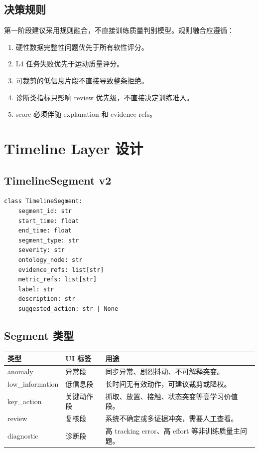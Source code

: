 \documentclass[UTF8,zihao=-4]{ctexart}
\begin{document}
\subsection{决策规则}

第一阶段建议采用规则融合，不直接训练质量判别模型。规则融合应遵循：

\begin{enumerate}
\item 硬性数据完整性问题优先于所有软性评分。
\item L4 任务失败优先于运动质量评分。
\item 可裁剪的低信息片段不直接导致整条拒绝。
\item 诊断类指标只影响 review 优先级，不直接决定训练准入。
\item score 必须伴随 explanation 和 evidence refs。
\end{enumerate}

\section{Timeline Layer 设计}

\subsection{TimelineSegment v2}

\begin{verbatim}
class TimelineSegment:
    segment_id: str
    start_time: float
    end_time: float
    segment_type: str
    severity: str
    ontology_node: str
    evidence_refs: list[str]
    metric_refs: list[str]
    label: str
    description: str
    suggested_action: str | None
\end{verbatim}

\subsection{Segment 类型}

\begin{longtable}{L{3.5cm} L{4cm} L{6cm}}
\toprule
类型 & UI 标签 & 用途 \\
\midrule
anomaly & 异常段 & 同步异常、剧烈抖动、不可解释突变。 \\
low\_information & 低信息段 & 长时间无有效动作，可建议裁剪或降权。 \\
key\_action & 关键动作段 & 抓取、放置、接触、状态突变等高学习价值段。 \\
review & 复核段 & 系统不确定或多证据冲突，需要人工查看。 \\
diagnostic & 诊断段 & 高 tracking error、高 effort 等非训练质量主问题。 \\
\bottomrule
\end{longtable}
\end{document}
